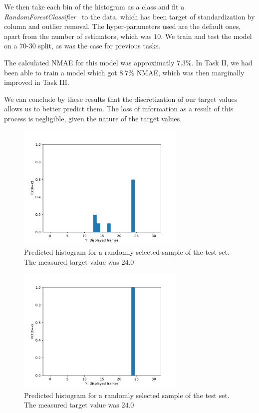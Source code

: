\documentclass[10pt]{article}
\begin{document}
We then take each bin of the histogram as a class and fit a \textit{RandomForestClassifier}~\cite{RFC} to the data, which has been target of standardization by column and outlier removal. The hyper-parameters used are the default ones, apart from the number of estimators, which was $10$. We train and test the model on a 70-30 split, as was the case for previous tasks.

The calculated \textsc{NMAE} for this model was approximatly $7.3\%$. In Task II, we had been able to train a model which got $8.7\%$ \textsc{NMAE}, which was then marginally improved in Task III. 

We can conclude by these results that the discretization of our target values allows us to better predict them. The loss of information as a result of this process is negligible, given the nature of the target values.

\pagebreak

\begin{figure}[h!]
    \centering
    \captionsetup{justification=centering}
    \includegraphics[width=0.72\textwidth,height=\textheight,keepaspectratio]{../result/project1/P(Y|X=x)_2643.pdf}
    \caption{Predicted histogram for a randomly selected sample of the test set. The measured target value was $24.0$}
    \label{fig:10}
\end{figure}

\begin{figure}[h!]
    \centering
    \captionsetup{justification=centering}
    \includegraphics[width=0.72\textwidth,height=\textheight,keepaspectratio]{../result/project1/P(Y|X=x)_7272.pdf}
    \caption{Predicted histogram for a randomly selected sample of the test set. The measured target value was $24.0$}
    \label{fig:11}
\end{figure}
\end{document}
